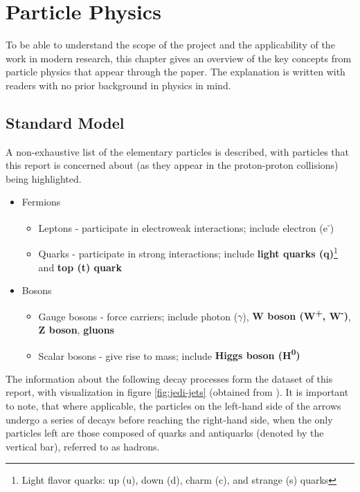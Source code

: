 \section{Particle Physics}
To be able to understand the scope of the project and the applicability of the work in modern research, this chapter gives an overview of the key concepts from particle physics that appear through the paper. The explanation is written with readers with no prior background in physics in mind.

\subsection{Standard Model}
A non-exhaustive list of the elementary particles is described, with particles that this report is concerned about (as they appear in the proton-proton collisions) being highlighted.

\begin{itemize}[leftmargin=7mm]
  \item Fermions
  \begin{itemize}[leftmargin=5mm]
    \item Leptons - participate in electroweak interactions; include electron (e\textsuperscript{-})
    \item Quarks - participate in strong interactions; include \textbf{light quarks (q)}\footnote{Light flavor quarks: up (u), down (d), charm (c), and strange (s) quarks} and \textbf{top (t) quark}
  \end{itemize}
  \item Bosons
  \begin{itemize}[leftmargin=5mm]
    \item Gauge bosons - force carriers; include photon ($\gamma$), \textbf{W boson (W\textsuperscript{+}, W\textsuperscript{-})}, \textbf{Z boson}, \textbf{gluons}
    \item Scalar bosons - give rise to mass; include \textbf{Higgs boson (H\textsuperscript{0})}
  \end{itemize}
\end{itemize}

The information about the following decay processes form the dataset of this report, with visualization in figure \ref{fig:jedi-jets} (obtained from \cite{9-newman2019jedi-net:}). It is important to note, that where applicable, the particles on the left-hand side of the arrows undergo a series of decays before reaching the right-hand side, when the only particles left are those composed of quarks and antiquarks (denoted by the vertical bar), referred to as hadrons.

